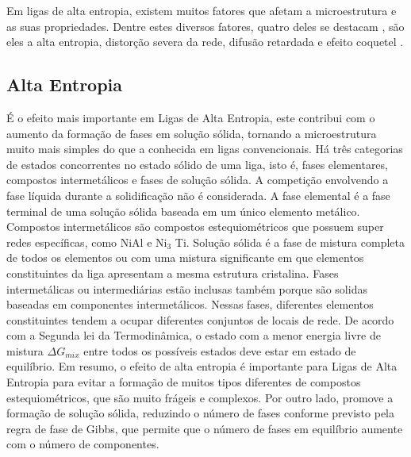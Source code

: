 Em ligas de alta entropia, existem muitos fatores que afetam a microestrutura e as suas propriedades. Dentre estes diversos fatores, quatro deles se destacam \cite{yeh2013alloy}, são eles a alta entropia, distorção severa da rede, difusão retardada e efeito coquetel \cite{gao2016high} \cite{murty2019high}.

\subsection{Alta Entropia}\label{sec:LABEL_CHP_3_SEC_B_SUB_B}

É o efeito mais importante em Ligas de Alta Entropia, este contribui com o aumento da formação de fases em solução sólida, tornando a microestrutura muito mais simples do que a conhecida em ligas convencionais. Há três categorias de estados concorrentes no estado sólido de uma liga, isto é, fases elementares, compostos intermetálicos e fases de solução sólida. 
A competição envolvendo a fase líquida durante a solidificação não é considerada. A fase elemental é a fase terminal de uma solução sólida baseada em um único elemento metálico. 
Compostos intermetálicos são compostos estequiométricos que possuem super redes específicas, como NiAl e Ni$_{3}$ Ti. Solução sólida é a fase de mistura completa de todos os elementos ou com uma mistura significante em que elementos constituintes da liga apresentam a mesma estrutura cristalina. Fases intermetálicas ou intermediárias estão inclusas também porque são solidas baseadas em componentes intermetálicos. Nessas fases, diferentes elementos constituintes tendem a ocupar diferentes conjuntos de locais de rede. De acordo com a Segunda lei da Termodinâmica, o estado com a menor energia livre de mistura $\Delta G_{mix}$ entre todos os possíveis estados deve estar em estado de equilíbrio. 
Em resumo, o efeito de alta entropia é importante para Ligas de Alta Entropia para evitar a formação de muitos tipos diferentes de compostos estequiométricos, que são muito frágeis e complexos. Por outro lado, promove a formação de solução sólida, reduzindo o número de fases conforme previsto pela regra de fase de Gibbs, que permite que o número de fases em equilíbrio aumente com o número de componentes. \cite{yeh2013alloy}




